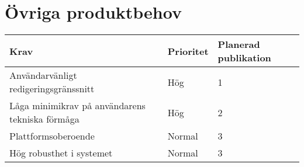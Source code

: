 \section{Övriga produktbehov}
\begin{tabular}{|l|l|l|}
\hline
Krav & Prioritet & Planerad publikation \\
\hline
Användarvänligt redigeringsgränssnitt & Hög & 1 \\
\hline
Låga minimikrav på användarens tekniska förmåga & Hög & 2 \\
\hline
Plattformsoberoende & Normal & 3 \\
\hline
Hög robusthet i systemet & Normal & 3 \\
\hline
\end{tabular}

